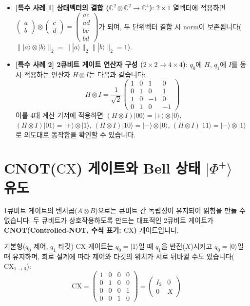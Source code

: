\documentclass[11pt, a4paper]{article}
\newcommand{\ket}[1]{|#1\rangle}
\theoremstyle{definition}
\begin{document}
\begin{itemize}
    \item \textbf{[특수 사례 1] 상태벡터의 결합 ($\mathbb{C}^2 \otimes \mathbb{C}^2 \to \mathbb{C}^4$)}: $2 \times 1$ 열벡터에 적용하면 $\begin{pmatrix} a \\ b \end{pmatrix} \otimes \begin{pmatrix} c \\ d \end{pmatrix} = \begin{pmatrix} ac \\ ad \\ bc \\ bd \end{pmatrix}$가 되며, 두 단위벡터 결합 시 norm이 보존됩니다($\|\ket{a}\otimes\ket{b}\|_2 = \|\ket{a}\|_2\|\ket{b}\|_2 = 1$).
    \item \textbf{[특수 사례 2] 2큐비트 게이트 연산자 구성 ($2\times 2 \to 4\times 4$)}: $q_0$에 $H$, $q_1$에 $I$를 동시 적용하는 연산자 $H \otimes I$는 다음과 같습니다:
    $$H \otimes I = \frac{1}{\sqrt{2}}\begin{pmatrix} 1 & 0 & 1 & 0 \\ 0 & 1 & 0 & 1 \\ 1 & 0 & -1 & 0 \\ 0 & 1 & 0 & -1 \end{pmatrix}$$
    이를 4대 계산 기저에 적용하면 $(H\otimes I)\ket{00} = \ket{+}\otimes\ket{0}$, $(H\otimes I)\ket{01} = \ket{+}\otimes\ket{1}$, $(H\otimes I)\ket{10} = \ket{-}\otimes\ket{0}$, $(H\otimes I)\ket{11} = \ket{-}\otimes\ket{1}$로 의도대로 동작함을 확인할 수 있습니다.
\end{itemize}

\section{CNOT(\texorpdfstring{$\mathrm{CX}$}{CX}) 게이트와 Bell 상태 \texorpdfstring{$\ket{\Phi^+}$}{|Phi+>} 유도}
1큐비트 게이트의 텐서곱($A \otimes B$)으로는 큐비트 간 독립성이 유지되어 얽힘을 만들 수 없습니다. 두 큐비트가 상호작용하도록 만드는 대표적인 2큐비트 게이트가 \textbf{CNOT(Controlled-NOT, 수식 표기: $\mathrm{CX}$)} 게이트입니다.

기본형($q_0$ 제어, $q_1$ 타깃) $\mathrm{CX}$ 게이트는 $q_0 = \ket{1}$일 때 $q_1$을 반전($X$)시키고 $q_0 = \ket{0}$일 때 유지하며, 회로 설계에 따라 제어와 타깃의 위치가 서로 뒤바뀔 수도 있습니다($\mathrm{CX}_{1 \to 0}$):
$$\mathrm{CX} = \begin{pmatrix} 1 & 0 & 0 & 0 \\ 0 & 1 & 0 & 0 \\ 0 & 0 & 0 & 1 \\ 0 & 0 & 1 & 0 \end{pmatrix} = \begin{pmatrix} I_2 & 0 \\ 0 & X \end{pmatrix}$$
\end{document}
